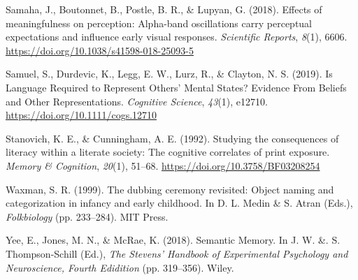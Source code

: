 \documentclass[11pt,man]{article}
\newlength{\cslhangindent}
\newenvironment{cslreferences}%
  {\setlength{\parindent}{0pt}%
  \everypar{\setlength{\hangindent}{\cslhangindent}}\ignorespaces}%
  {\par}
\begin{document}
\begin{cslreferences}
\leavevmode\hypertarget{ref-samaha_effects_2018}{}%
Samaha, J., Boutonnet, B., Postle, B. R., \& Lupyan, G. (2018). Effects
of meaningfulness on perception: Alpha-band oscillations carry
perceptual expectations and influence early visual responses.
\emph{Scientific Reports}, \emph{8}(1), 6606.
\url{https://doi.org/10.1038/s41598-018-25093-5}

\leavevmode\hypertarget{ref-samuel_is_2019}{}%
Samuel, S., Durdevic, K., Legg, E. W., Lurz, R., \& Clayton, N. S.
(2019). Is Language Required to Represent Others' Mental States?
Evidence From Beliefs and Other Representations. \emph{Cognitive
Science}, \emph{43}(1), e12710. \url{https://doi.org/10.1111/cogs.12710}

\leavevmode\hypertarget{ref-stanovich_studying_1992}{}%
Stanovich, K. E., \& Cunningham, A. E. (1992). Studying the consequences
of literacy within a literate society: The cognitive correlates of print
exposure. \emph{Memory \& Cognition}, \emph{20}(1), 51--68.
\url{https://doi.org/10.3758/BF03208254}

\leavevmode\hypertarget{ref-waxman_dubbing_1999}{}%
Waxman, S. R. (1999). The dubbing ceremony revisited: Object naming and
categorization in infancy and early childhood. In D. L. Medin \& S.
Atran (Eds.), \emph{Folkbiology} (pp. 233--284). MIT Press.

\leavevmode\hypertarget{ref-yee_semantic_2018}{}%
Yee, E., Jones, M. N., \& McRae, K. (2018). Semantic Memory. In J. W.
\&. S. Thompson-Schill (Ed.), \emph{The Stevens' Handbook of
Experimental Psychology and Neuroscience, Fourth Edidition} (pp.
319--356). Wiley.
\end{cslreferences}
\end{document}

